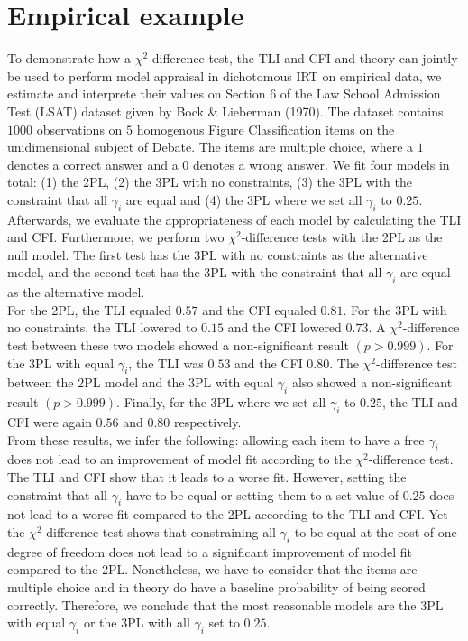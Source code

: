 \documentclass[Royal,sageapa,times,doublespace]{sagej}
\begin{document}
\section{\centering Empirical example}
To demonstrate how a $\chi^2$-difference test, the TLI and CFI and theory can jointly be used to perform model appraisal in dichotomous IRT on empirical data, we estimate and interprete their values on Section 6 of the Law School Admission Test (LSAT) dataset given by Bock \& Lieberman (1970). The dataset contains $1000$ observations on $5$ homogenous Figure Classification items on the unidimensional subject of Debate. The items are multiple choice, where a $1$ denotes a correct answer and a $0$ denotes a wrong answer. We fit four models in total: (1) the 2PL, (2) the 3PL with no constraints, (3) the 3PL with the constraint that all $\gamma_i$ are equal and (4) the 3PL where we set all $\gamma_i$ to $0.25$. Afterwards, we evaluate the appropriateness of each model by calculating the TLI and CFI. Furthermore, we perform two $\chi^2$-difference tests with the 2PL as the null model. The first test has the 3PL with no constraints as the alternative model, and the second test has the 3PL with the constraint that all $\gamma_i$ are equal as the alternative model. \\
\indent For the 2PL, the TLI equaled $0.57$ and the CFI equaled $0.81$. For the 3PL with no constraints, the TLI lowered to $0.15$ and the CFI lowered $0.73$. A $\chi^2$-difference test between these two models showed a non-significant result $(p > 0.999)$. For the 3PL with equal $\gamma_i$, the TLI was $0.53$ and the CFI $0.80$. The $\chi^2$-difference test between the 2PL model and the 3PL with equal $\gamma_i$ also showed a non-significant result $(p > 0.999)$. Finally, for the 3PL where we set all $\gamma_i$ to $0.25$, the TLI and CFI were again $0.56$ and $0.80$ respectively. \\
\indent From these results, we infer the following: allowing each item to have a free $\gamma_i$ does not lead to an improvement of model fit according to the $\chi^2$-difference test. The TLI and CFI show that it leads to a worse fit. However, setting the constraint that all $\gamma_i$ have to be equal or setting them to a set value of $0.25$ does not lead to a worse fit compared to the 2PL according to the TLI and CFI. Yet the $\chi^2$-difference test shows that constraining all $\gamma_i$ to be equal at the cost of one degree of freedom does not lead to a significant improvement of model fit compared to the 2PL. Nonetheless, we have to consider that the items are multiple choice and in theory do have a baseline probability of being scored correctly. Therefore, we conclude that the most reasonable models are the 3PL with equal $\gamma_i$ or the 3PL with all $\gamma_i$ set to $0.25$. \\
\end{document}
